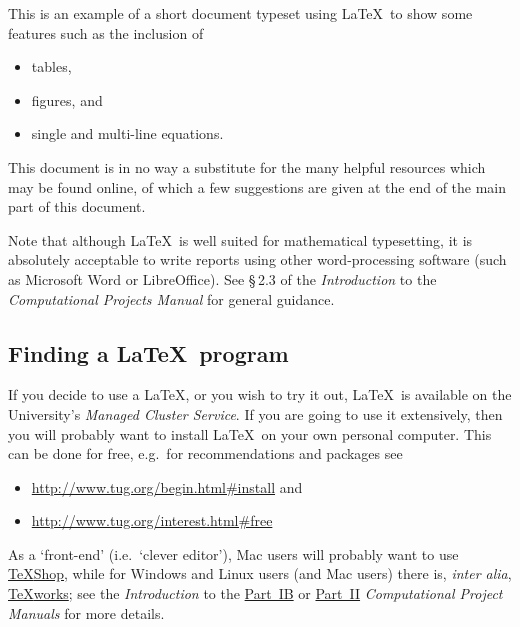 This is an example of a short document typeset using \LaTeX\ to show
some features such as the inclusion of
\begin{itemize}
\item tables,
\item figures, and
\item single and multi-line equations.
\end{itemize}


This document is in no way a substitute for the many helpful resources
which may be found online, of which a few suggestions are given at the
end of the main part of this document.

Note that although \LaTeX\ is well suited for mathematical
typesetting, it is absolutely acceptable to write reports using other
word-processing software (such as Microsoft Word or LibreOffice).
%
%
See \S\,2.3 of the \textsl{Introduction} to the \textsl{Computational
  Projects Manual} for general guidance.

\subsection{Finding a \LaTeX\ program}

If you decide to use a \LaTeX, or you wish to try it out, \LaTeX\ is
available on the University's \textsl{Managed Cluster Service}. If you
are going to use it extensively, then you will probably want to
install \LaTeX\ on your own personal computer. This can be done for
free, e.g.\ for recommendations and packages see
\begin{itemize}
\item \url{http://www.tug.org/begin.html\#install} and
\item \url{http://www.tug.org/interest.html\#free}
\end{itemize}
As a `front-end' (i.e.\ `clever editor'), Mac users will probably want
to use \href{http://pages.uoregon.edu/koch/texshop/}{{\TeX}Shop},
while for Windows and Linux users (and Mac users) there is,
\textit{inter alia}, \href{http://www.tug.org/texworks/}{{\TeX}works};
see the \textsl{Introduction} to the
\href{http://www.maths.cam.ac.uk/undergrad/catam/IB/}{Part~IB} or
\href{http://www.maths.cam.ac.uk/undergrad/catam/II/}{Part~II}
\textsl{Computational Project Manuals} for more details.

